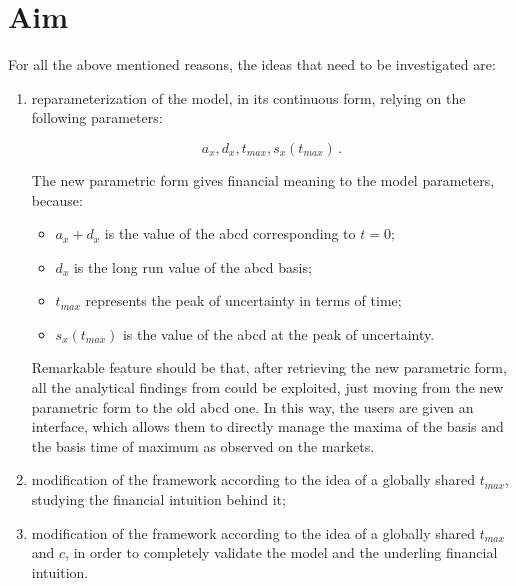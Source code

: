 {\section*{Aim}

For all the above mentioned reasons, the ideas that need to be investigated are:

\begin{enumerate}

\item reparameterization of the model, in its continuous form, relying on the following parameters: 

\begin{equation}
    a_{x}, d_{x}, t_{max}, s_{x}(t_{max})\,.
    \label{parameters}
\end{equation}

The new parametric form gives financial meaning to the model parameters, because:

\begin{itemize}
    \item $a_{x} + d_{x}$ is the value of the abcd corresponding to $t=0$;
    \item $d_{x}$ is the long run value of the abcd basis;
    \item $t_{max}$ represents the peak of uncertainty in terms of time;
    \item $s_{x}(t_{max})$ is the value of the abcd at the peak of uncertainty.
\end{itemize}
Remarkable feature should be that, after retrieving the new parametric form, all the analytical findings from \cite{ametrano_ballabio_mazzocchi} could be exploited, just moving from the new parametric form to the old abcd one.
In this way, the users are given an interface, which allows them to directly manage the maxima of the basis and the basis time of maximum as observed on the markets.

\item modification of the framework according to the idea of a globally shared $t_{max}$, studying the financial intuition behind it;

\item modification of the framework according to the idea of a globally shared $t_{max}$ and $c$, in order to completely validate the model and the underling financial intuition.

\end{enumerate}
}